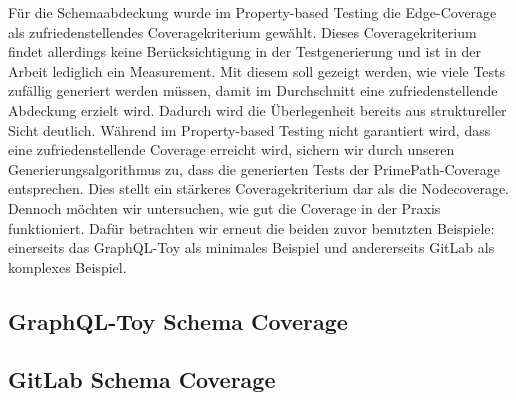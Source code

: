 Für die Schemaabdeckung wurde im Property-based Testing die Edge-Coverage als zufriedenstellendes Coveragekriterium gewählt.
Dieses Coveragekriterium findet allerdings keine Berücksichtigung in der Testgenerierung und ist in der Arbeit lediglich ein Measurement.
Mit diesem soll gezeigt werden, wie viele Tests zufällig generiert werden müssen, damit im Durchschnitt eine zufriedenstellende Abdeckung erzielt wird.
Dadurch wird die Überlegenheit bereits aus struktureller Sicht deutlich.
Während im Property-based Testing nicht garantiert wird, dass eine zufriedenstellende Coverage erreicht wird,
sichern wir durch unseren Generierungsalgorithmus zu, dass die generierten Tests der PrimePath-Coverage entsprechen.
Dies stellt ein stärkeres Coveragekriterium dar als die Nodecoverage.
Dennoch möchten wir untersuchen, wie gut die Coverage in der Praxis funktioniert.
Dafür betrachten wir erneut die beiden zuvor benutzten Beispiele: einerseits das GraphQL-Toy als minimales Beispiel und andererseits GitLab als komplexes Beispiel.

\subsection{GraphQL-Toy Schema Coverage}

\subsection{GitLab Schema Coverage}